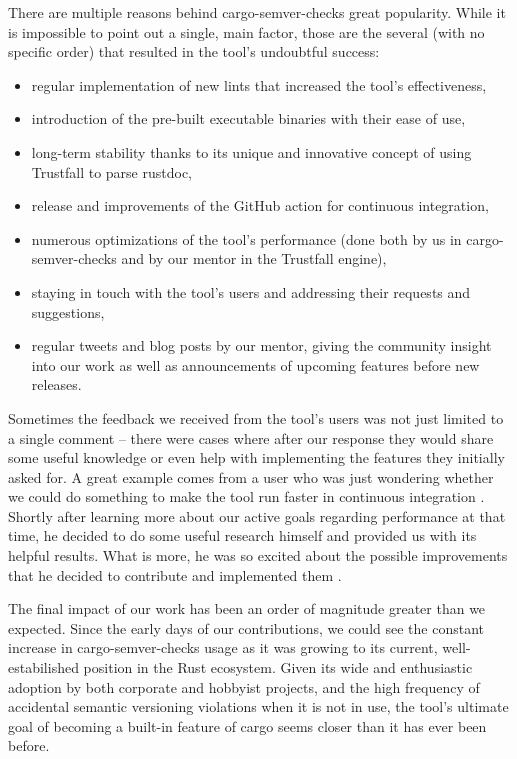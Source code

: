\documentclass[licencjacka,en]{pracamgr}
\begin{document}
There are multiple reasons behind cargo-semver-checks great popularity. While it
is impossible to point out a single, main factor, those are the several (with no specific order) that
resulted in the tool's undoubtful success:
\begin{itemize}
	\item regular implementation of new lints that increased the tool's effectiveness,
	\item introduction of the pre-built executable binaries with their ease of use,
	\item long-term stability thanks to its unique and innovative concept of using Trustfall
		to parse rustdoc,
	\item release and improvements of the GitHub action for continuous integration,
	\item numerous optimizations of the tool's performance (done both by us in
		cargo-semver-checks and by our mentor in the Trustfall engine),
	\item staying in touch with the tool's users and addressing their requests and suggestions,
	\item regular tweets and blog posts by our mentor, giving the community insight into our work
		as well as announcements of upcoming features before new releases.
\end{itemize}

Sometimes the feedback we received from the tool's users was not just limited to a single comment
-- there were cases where after our response they would share some useful
knowledge or even help with implementing the features they initially asked for. A great example
comes from a user who was just wondering whether we could do something to make the tool run faster
in continuous integration \cite{make-ci-runs-faster}. Shortly after learning more about our active
goals regarding performance at that time, he decided to do some useful research himself
and provided us with its helpful results. What is more, he was so excited about the possible
improvements that he decided to contribute and implemented them \cite{user-contribution-1}.

The final impact of our work has been an order of magnitude greater than we expected.
Since the early days of our contributions, we could see the constant increase
in cargo-semver-checks usage as it was growing to its current, well-estabilished position in
the Rust ecosystem. Given its wide and enthusiastic adoption by both corporate and hobbyist
projects, and the high frequency of accidental semantic versioning violations when it is not
in use, the tool's ultimate goal of becoming a built-in feature of cargo seems closer than it has
ever been before.
\end{document}
